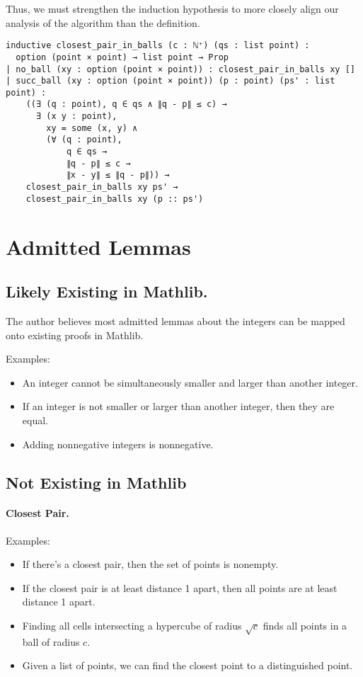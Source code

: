 \documentclass{article}
\begin{document}
Thus, we must strengthen the induction hypothesis to more closely align our analysis of the algorithm than the definition.

\begin{verbatim}
inductive closest_pair_in_balls (c : ℕ⁺) (qs : list point) :
  option (point × point) → list point → Prop
| no_ball (xy : option (point × point)) : closest_pair_in_balls xy []
| succ_ball (xy : option (point × point)) (p : point) (ps' : list point) :
    ((∃ (q : point), q ∈ qs ∧ ∥q - p∥ ≤ c) →
      ∃ (x y : point),
        xy = some (x, y) ∧
        (∀ (q : point),
            q ∈ qs →
            ∥q - p∥ ≤ c →
            ∥x - y∥ ≤ ∥q - p∥)) →
    closest_pair_in_balls xy ps' →
    closest_pair_in_balls xy (p :: ps')
\end{verbatim}

\section{Admitted Lemmas}

\subsection{Likely Existing in Mathlib.}
The author believes most admitted lemmas about the integers can be mapped onto existing proofs in Mathlib.

Examples:
\begin{itemize}
  \item An integer cannot be simultaneously smaller and larger than another integer.
  \item If an integer is not smaller or larger than another integer, then they are equal.
  \item Adding nonnegative integers is nonnegative.
\end{itemize}

\subsection{Not Existing in Mathlib}
\paragraph{Closest Pair.}
Examples:
\begin{itemize}
  \item If there's a closest pair, then the set of points is nonempty.
  \item If the closest pair is at least distance 1 apart, then all points are at least distance 1 apart.
  \item Finding all cells intersecting a hypercube of radius $\sqrt{c}$ finds all points in a ball of radius $c$.
  \item Given a list of points, we can find the closest point to a distinguished point.
\end{itemize}
\end{document}
